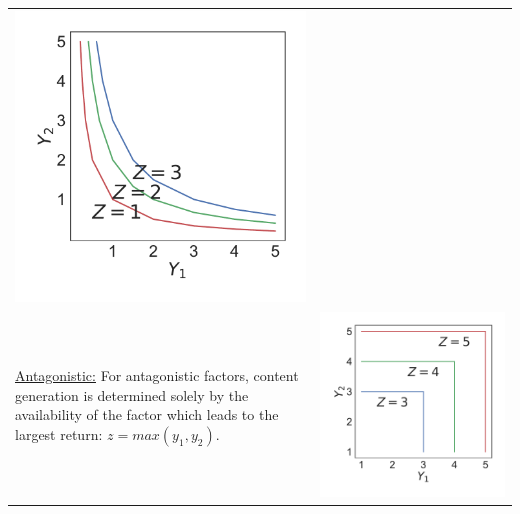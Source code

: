 \begin{table}[h!]
\begin{tabular}{m{} c}
\begin{minipage}{.175\textwidth}
      \includegraphics[width=.975\textwidth, height=.975\textwidth]{Figures/Interactive_Essential.pdf}
    \end{minipage}
    \\
    \uline{Antagonistic:} For antagonistic factors, content generation is determined solely by the availability of the factor which leads to the largest return: $z = max(y_1, y_2)$. 
    &
    \begin{minipage}{.175\textwidth}
      \includegraphics[width=.975\textwidth, height=.975\textwidth]{Figures/Switching.pdf}

\end{minipage}
\end{tabular}
\end{table}
